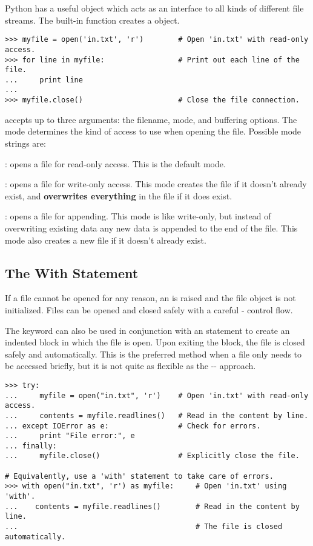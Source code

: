 Python has a useful  object which acts as an interface to all kinds of different file streams.
The built-in function  creates a  object.

\begin{lstlisting}
>>> myfile = open('in.txt', 'r')        # Open 'in.txt' with read-only access.
>>> for line in myfile:                 # Print out each line of the file.
...     print line
...
>>> myfile.close()                      # Close the file connection.
\end{lstlisting}

 accepts up to three arguments: the filename, mode, and buffering options.
The mode determines the kind of access to use when opening the file.
Possible mode strings are:
\begin{description}
\item {}: opens a file for read-only access.
This is the default mode.
\item {}: opens a file for write-only access.
This mode creates the file if it doesn't already exist, and \textbf{overwrites everything} in the file if it does exist.
\item {}: opens a file for appending.
This mode is like write-only, but instead of overwriting existing data any new data is appended to the end of the file.
This mode also creates a new file if it doesn't already exist.
\end{description}

\subsection*{The With Statement} %

If a file cannot be opened for any reason, an  is raised and the file object is not initialized.
Files can be opened and closed safely with a careful - control flow. %

The keyword  can also be used in conjunction with an  statement to create an indented block in which the file is open.
Upon exiting the block, the file is closed safely and automatically.
This is the preferred method when a file only needs to be accessed briefly, but it is not quite as flexible as the -- approach.

\begin{lstlisting}
>>> try:
...     myfile = open("in.txt", 'r')    # Open 'in.txt' with read-only access.
...     contents = myfile.readlines()   # Read in the content by line.
... except IOError as e:                # Check for errors.
...     print "File error:", e
... finally:
...     myfile.close()                  # Explicitly close the file.

# Equivalently, use a 'with' statement to take care of errors.
>>> with open("in.txt", 'r') as myfile:     # Open 'in.txt' using 'with'.
...    contents = myfile.readlines()        # Read in the content by line.
...                                         # The file is closed automatically.
\end{lstlisting}

